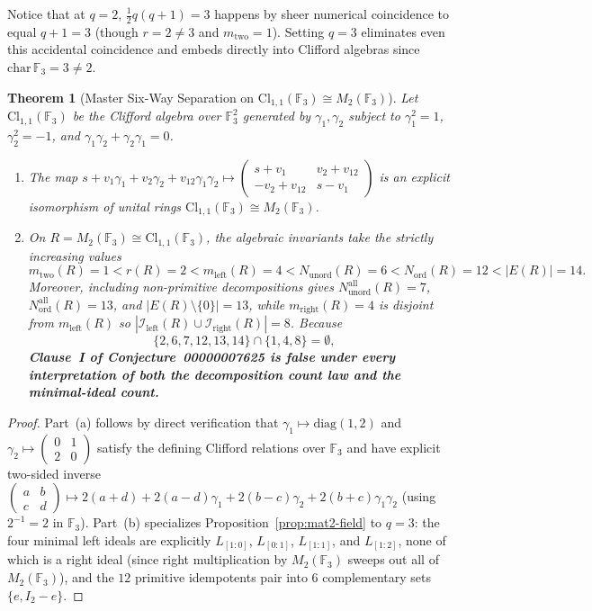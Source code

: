 \documentclass[11pt]{article}
\newtheorem{theorem}{Theorem}[section]
\theoremstyle{definition}
\newcommand{\Cl}{\mathrm{Cl}}
\newcommand{\Mat}{M}
\newcommand{\F}{\mathbb{F}}
\begin{document}
Notice that at $q = 2$, $\frac{1}{2}q(q+1) = 3$ happens by sheer numerical
coincidence to equal $q + 1 = 3$ (though $r = 2 \neq 3$ and $m_{\mathrm{two}} = 1$).
Setting $q = 3$ eliminates even this accidental coincidence and embeds directly
into Clifford algebras since $\mathrm{char}\,\F_3 = 3 \neq 2$.

\begin{theorem}[Master Six-Way Separation on $\Cl_{1,1}(\F_3) \cong \Mat_2(\F_3)$]
\label{thm:master-f3}
Let $\Cl_{1,1}(\F_3)$ be the Clifford algebra over $\F_3^2$ generated by
$\gamma_1, \gamma_2$ subject to $\gamma_1^2 = 1$, $\gamma_2^2 = -1$, and
$\gamma_1 \gamma_2 + \gamma_2 \gamma_1 = 0$.
\begin{enumerate}
\item[(a)] The map $s + v_1 \gamma_1 + v_2 \gamma_2 + v_{12}\gamma_1\gamma_2 \mapsto
\begin{pmatrix} s + v_1 & v_2 + v_{12} \\ -v_2 + v_{12} & s - v_1 \end{pmatrix}$
is an explicit isomorphism of unital rings $\Cl_{1,1}(\F_3) \cong \Mat_2(\F_3)$.
\item[(b)] On $R = \Mat_2(\F_3) \cong \Cl_{1,1}(\F_3)$, the algebraic invariants take
the strictly increasing values
\[
  m_{\mathrm{two}}(R) = 1 < r(R) = 2 < m_{\mathrm{left}}(R) = 4
  < N_{\mathrm{unord}}(R) = 6 < N_{\mathrm{ord}}(R) = 12 < |E(R)| = 14.
\]
Moreover, including non-primitive decompositions gives
$N_{\mathrm{unord}}^{\mathrm{all}}(R) = 7$,
$N_{\mathrm{ord}}^{\mathrm{all}}(R) = 13$, and $|E(R) \setminus \{0\}| = 13$,
while $m_{\mathrm{right}}(R) = 4$ is disjoint from $m_{\mathrm{left}}(R)$ so
$|\mathcal{I}_{\mathrm{left}}(R) \cup \mathcal{I}_{\mathrm{right}}(R)| = 8$.
Because
\[
  \{2, 6, 7, 12, 13, 14\} \cap \{1, 4, 8\} = \emptyset,
\]
\textbf{Clause~I of Conjecture~00000007625 is false under every interpretation
of both the decomposition count law and the minimal-ideal count.}
\end{enumerate}
\end{theorem}

\begin{proof}
Part~(a) follows by direct verification that $\gamma_1 \mapsto \mathrm{diag}(1,2)$
and $\gamma_2 \mapsto \begin{pmatrix} 0 & 1 \\ 2 & 0 \end{pmatrix}$ satisfy the
defining Clifford relations over $\F_3$ and have explicit two-sided inverse
$\begin{pmatrix} a & b \\ c & d \end{pmatrix} \mapsto
2(a+d) + 2(a-d)\gamma_1 + 2(b-c)\gamma_2 + 2(b+c)\gamma_1\gamma_2$ (using
$2^{-1} = 2$ in $\F_3$). Part~(b) specializes Proposition~\ref{prop:mat2-field}
to $q = 3$: the four minimal left ideals are explicitly $L_{[1:0]}$, $L_{[0:1]}$,
$L_{[1:1]}$, and $L_{[1:2]}$, none of which is a right ideal (since right
multiplication by $\Mat_2(\F_3)$ sweeps out all of $\Mat_2(\F_3)$), and the
$12$ primitive idempotents pair into $6$ complementary sets $\{e, I_2 - e\}$.
\end{proof}
\end{document}
